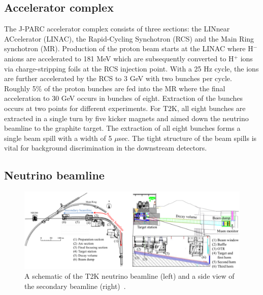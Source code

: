 \subsection{Accelerator complex}
\label{subsec:AcceleratorComplex}
The J-PARC accelerator complex consists of three sections: the LINnear ACcelerator (LINAC), the Rapid-Cycling Synchotron (RCS) and the Main Ring synchotron (MR).  Production of the proton beam starts at the LINAC where H$^-$ anions are accelerated to 181 MeV which are subsequently converted to H$^+$ ions via charge-stripping foils at the RCS injection point.  With a 25 Hz cycle, the ions are further accelerated by the RCS to 3 GeV with two bunches per cycle.  Roughly 5$\%$ of the proton bunches are fed into the MR where the final acceleration to 30 GeV occurs in bunches of eight.  Extraction of the bunches occurs at two points for different experiments.  For T2K, all eight bunches are extracted in a single turn by five kicker magnets and aimed down the neutrino beamline to the graphite target.  The extraction of all eight bunches forms a single beam spill with a width of 5 $\mu$sec.  The tight structure of the beam spills is vital for background discrimination in the downstream detectors.

\subsection{Neutrino beamline}
\label{subsec:NeutrinoBeamline}

\begin{figure}
  \centering
  \includegraphics[width=15cm]{images/t2k/neutrino_beamline.pdf}
  \caption{A schematic of the T2K neutrino beamline (left) and a side view of the secondary beamline (right)~\cite{Abe2011106}.}
  \label{fig:NeutrinoBeamline}
\end{figure}

